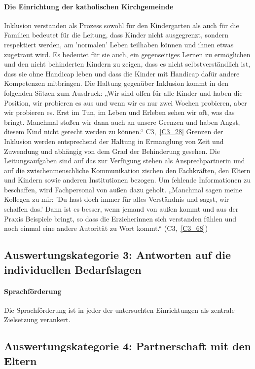 \paragraph{Die Einrichtung der katholischen Kirchgemeinde}
Inklusion verstanden als Prozess sowohl für den Kindergarten als auch für die Familien bedeutet für die Leitung, dass Kinder nicht ausgegrenzt, sondern respektiert werden, am 'normalen' Leben teilhaben können und ihnen etwas zugetraut wird. Es bedeutet für sie auch, ein gegenseitiges Lernen zu ermöglichen und den nicht behinderten Kindern zu zeigen, dass es nicht selbstverständlich ist, dass sie ohne Handicap leben und dass die Kinder mit Handicap dafür andere Kompetenzen mitbringen. Die Haltung gegenüber Inklusion kommt in den folgenden Sätzen zum Ausdruck: „Wir sind offen für alle Kinder und haben die Position, wir probieren es aus und wenn wir es nur zwei Wochen probieren, aber wir probieren es. Erst im Tun, im Leben und Erleben sehen wir oft, was das bringt. Manchmal stoßen wir dann auch an unsere Grenzen und haben Angst, diesem Kind nicht gerecht werden zu können.“ C3,~\ref{C3_28} Grenzen der Inklusion werden entsprechend der Haltung in Ermanglung von Zeit und Zuwendung und abhängig von dem Grad der Behinderung gesehen.  
Die Leitungsaufgaben sind auf das zur Verfügung stehen als Ansprechpartnerin  und auf die zwischenmenschliche Kommunikation zischen den Fachkräften, den Eltern und Kindern sowie anderen Institutionen bezogen. Um fehlende Informationen zu beschaffen, wird Fachpersonal von außen dazu geholt.
„Manchmal sagen meine Kollegen zu mir: 'Du hast doch immer für alles Verständnis und sagst, wir schaffen das.' Dann ist es besser, wenn jemand von außen kommt und aus der Praxis Beispiele bringt, so dass die Erzieherinnen sich verstanden fühlen und noch einmal eine andere Autorität zu Wort kommt.“ (C3,~\ref{C3_68}) 

\subsection{Auswertungskategorie 3: Antworten auf die individuellen Bedarfslagen}

\paragraph{Sprachförderung}
Die Sprachförderung ist in jeder der untersuchten Einrichtungen als zentrale Zielsetzung verankert.


\subsection{Auswertungskategorie 4: Partnerschaft mit den Eltern}

